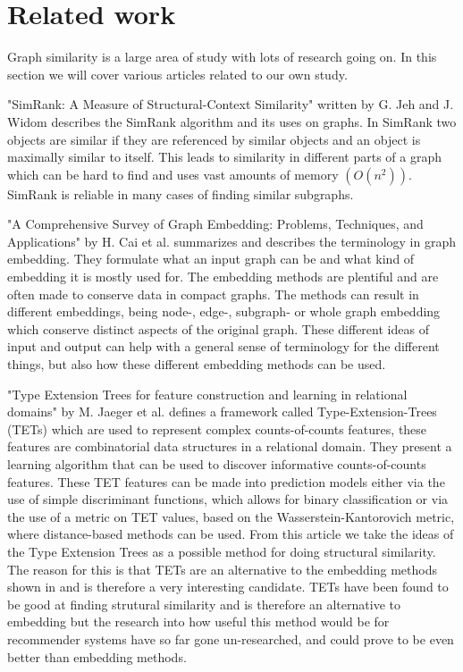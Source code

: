 \section{Related work}
\label{sec:Related_work}
Graph similarity is a large area of study with lots of research going on. In this section we will cover various articles related to our own study.

"SimRank: A Measure of Structural-Context Similarity" written by G. Jeh and J. Widom\cite{10.1145/775047.775126} describes the SimRank algorithm and its uses on graphs. 
In SimRank two objects are similar if they are referenced by similar objects and an object is maximally similar to itself. 
This leads to similarity in different parts of a graph which can be hard to find and uses vast amounts of memory $(O(n^2))$. SimRank is reliable in many cases of finding similar subgraphs.

"A Comprehensive Survey of Graph Embedding: Problems, Techniques, and Applications" by H. Cai et al.\cite{8294302} summarizes and describes the terminology in graph embedding. 
They formulate what an input graph can be and what kind of embedding it is mostly used for.
 The embedding methods are plentiful and are often made to conserve data in compact graphs. 
The methods can result in different embeddings, being node-, edge-, subgraph- or whole graph embedding which conserve distinct aspects of the original graph. 
These different ideas of input and output can help with a general sense of terminology for the different things, but also how these different embedding methods can be used.

"Type Extension Trees for feature construction and learning in relational domains" by M. Jaeger et al. \cite{JAEGER201330} defines a framework called Type-Extension-Trees (TETs) which are used to represent complex counts-of-counts features, these features are combinatorial data structures in a relational domain. 
They present a learning algorithm that can be used to discover informative counts-of-counts features. 
These TET features can be made into prediction models either via the use of simple discriminant functions, which allows for binary classification or via the use of a metric on TET values, based on the Wasserstein-Kantorovich metric, where distance-based methods can be used. From this article we take the ideas of the Type Extension Trees as a possible method for doing structural similarity.
The reason for this is that TETs are an alternative to the embedding methods shown in \cite{8294302} and is therefore a very interesting candidate. 
TETs have been found to be good at finding strutural similarity and is therefore an alternative to embedding but the research into how useful this method would be for recommender systems have so far gone un-researched, and could prove to be even better than embedding methods.

